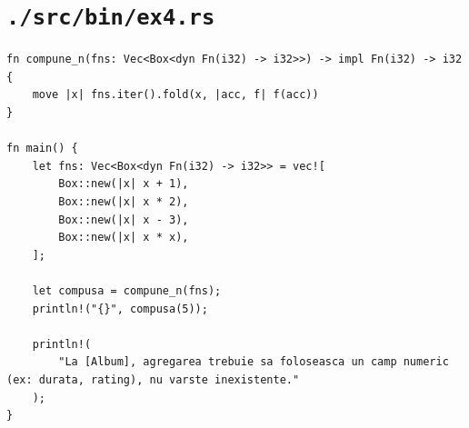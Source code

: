 \documentclass[11pt]{article}
\begin{document}
\section{\texttt{./src/bin/ex4.rs}}
\label{sec:org35cdfd1}
\begin{verbatim}
fn compune_n(fns: Vec<Box<dyn Fn(i32) -> i32>>) -> impl Fn(i32) -> i32 {
    move |x| fns.iter().fold(x, |acc, f| f(acc))
}

fn main() {
    let fns: Vec<Box<dyn Fn(i32) -> i32>> = vec![
        Box::new(|x| x + 1),
        Box::new(|x| x * 2),
        Box::new(|x| x - 3),
        Box::new(|x| x * x),
    ];

    let compusa = compune_n(fns);
    println!("{}", compusa(5));

    println!(
        "La [Album], agregarea trebuie sa foloseasca un camp numeric (ex: durata, rating), nu varste inexistente."
    );
}
\end{verbatim}
\end{document}
